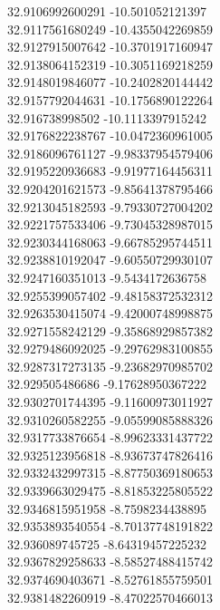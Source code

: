 {32.9106992600291	-10.501052121397\\
32.9117561680249	-10.4355042269859\\
32.9127915007642	-10.3701917160947\\
32.9138064152319	-10.3051169218259\\
32.9148019846077	-10.2402820144442\\
32.9157792044631	-10.1756890122264\\
32.916738998502	-10.1113397915242\\
32.9176822238767	-10.0472360961005\\
32.9186096761127	-9.98337954579406\\
32.9195220936683	-9.91977164456311\\
32.9204201621573	-9.85641378795466\\
32.9213045182593	-9.79330727004202\\
32.9221757533406	-9.73045328987015\\
32.9230344168063	-9.66785295744511\\
32.9238810192047	-9.60550729930107\\
32.9247160351013	-9.5434172636758\\
32.9255399057402	-9.48158372532312\\
32.9263530415074	-9.42000748998875\\
32.9271558242129	-9.35868929857382\\
32.9279486092025	-9.29762983100855\\
32.9287317273135	-9.23682970985702\\
32.929505486686	-9.17628950367222\\
32.9302701744395	-9.11600973011927\\
32.9310260582255	-9.05599085888326\\
32.9317733876654	-8.99623331437722\\
32.9325123956818	-8.93673747826416\\
32.9332432997315	-8.87750369180653\\
32.9339663029475	-8.81853225805522\\
32.9346815951958	-8.7598234438895\\
32.9353893540554	-8.70137748191822\\
32.936089745725	-8.64319457225232\\
32.9367829258633	-8.58527488415742\\
32.9374690403671	-8.52761855759501\\
32.9381482260919	-8.47022570466013\\
}

